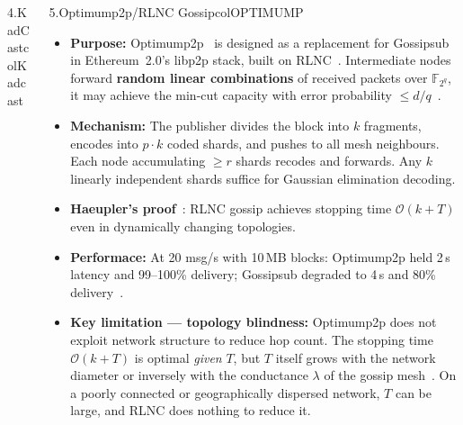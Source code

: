 \documentclass[final]{beamer}
\newcommand{\pbody}{\fontsize{21}{27}\selectfont}
\newlength{\colwidth}
\newlength{\gutter}
\begin{document}
\begin{frame}[t]
\begin{columns}[T, totalwidth=0.97\paperwidth]
\begin{column}{\colwidth}
\begin{panel}{4.\enspace KadCast}{colKadcast}
\end{panel}

\end{column}


\hspace{\gutter}


\begin{column}{\colwidth}

\begin{panel}{5.\enspace Optimump2p/RLNC Gossip}{colOPTIMUMP}
  \pbody\justifying
  
  \begin{itemize}\setlength\itemsep{4pt}
    \item \textbf{Purpose:} Optimump2p~\cite{optimump2p2025} is designed as a replacement for Gossipsub in Ethereum~2.0's libp2p stack, built on RLNC~\cite{ho2006}. Intermediate nodes forward \textbf{random linear combinations} of received packets over $\mathbb{F}_{2^q}$, it may achieve the min-cut capacity with error probability $\leq d/q$~\cite{ho2006}.
    \item \textbf{Mechanism:} The publisher divides the block into $k$ fragments, encodes into $p \cdot k$ coded shards, and pushes to all mesh neighbours. Each node accumulating $\geq r$ shards recodes and forwards. Any $k$ linearly independent shards suffice for Gaussian elimination decoding.
    \item \textbf{Haeupler's proof}~\cite{haeupler2010}: RLNC gossip achieves stopping time $\mathcal{O}{(k + T)}$ even in dynamically changing topologies.
    \item \textbf{Performace:} At 20 msg/s with 10\,MB blocks: Optimump2p held 2\,s latency and 99--100\% delivery; Gossipsub degraded to 4\,s and 80\% delivery~\cite{optimump2p2025}.
    \item \textbf{Key limitation --- topology blindness:} Optimump2p does not exploit network structure to reduce hop count. The stopping time $\mathcal{O}{(k + T)}$ is optimal \emph{given} $T$, but $T$ itself grows with the network diameter or inversely with the conductance $\lambda$ of the gossip mesh~\cite{haeupler2010}. On a poorly connected or geographically dispersed network, $T$ can be large, and RLNC does nothing to reduce it.
  \end{itemize}


\end{panel}
\end{column}
\end{columns}
\end{frame}
\end{document}
